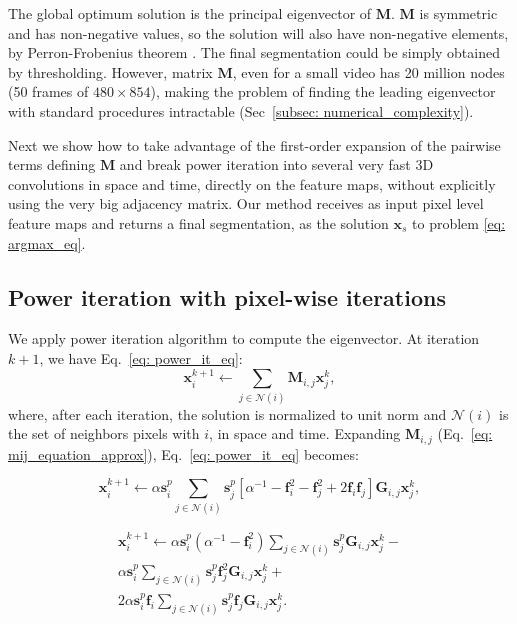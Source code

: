\documentclass{article}
\begin{document}
The global optimum solution is the principal eigenvector of $\mathbf{M}$. $\mathbf{M}$ is symmetric and has non-negative values, so the solution will also have non-negative elements, by Perron-Frobenius theorem \cite{frobenius}. The final segmentation could be simply obtained by thresholding. However, matrix $\mathbf{M}$, even for a small video has 20 million nodes (50 frames of $480 \times 854$), making the problem of finding the leading eigenvector with standard procedures intractable (Sec~\ref{subsec: numerical_complexity}).

Next we show how to take advantage of the first-order expansion of the pairwise terms defining $\mathbf{M}$ and break power iteration into several very fast 3D convolutions in space and time, directly on the feature maps, without explicitly using the very big adjacency matrix. Our method receives as input pixel level feature maps and returns a final segmentation, as the solution $\mathbf{x}_s$ to problem \ref{eq: argmax_eq}.


\subsection{Power iteration with pixel-wise iterations}
We apply power iteration algorithm to compute the eigenvector. At iteration $k+1$, we have Eq.~\ref{eq: power_it_eq}:
\begin{equation}
	\mathbf{x}^{k+1}_i \leftarrow \sum_{j \in \mathcal{N}(i)}\mathbf{M}_{i, j} \mathbf{x}^k_j, 
	\label{eq: power_it_eq}
\end{equation}
where, after each iteration, the solution is normalized to unit norm and $\mathcal{N}(i)$ is the set of neighbors pixels with $i$, in space and time. Expanding $\mathbf{M}_{i, j}$ (Eq.~\ref{eq: mij_equation_approx}), Eq.~\ref{eq: power_it_eq} becomes:

\begin{equation}
\mathbf{x}^{k+1}_i \leftarrow \alpha \mathbf{s}_i^p \sum_{j \in \mathcal{N}(i)} \mathbf{s}_j^p [\alpha^{-1} - \mathbf{f}_i^2 - \mathbf{f}_j^2 + 2 \mathbf{f}_i \mathbf{f}_j] \mathbf{G}_{i, j} \mathbf{x}^k_j,
\end{equation}

\begin{equation}
\label{eq: before_matrix_form}
  \begin{aligned}
    \mathbf{x}^{k+1}_i \leftarrow  \alpha \mathbf{s}_i^p ( \alpha^{-1} - \mathbf{f}_i^2) \sum_{j \in \mathcal{N}(i)} \mathbf{s}_j^p  \mathbf{G}_{i, j} \mathbf{x}^k_j -\\
    \alpha \mathbf{s}_i^p \sum_{j \in \mathcal{N}(i)}  \mathbf{s}_j^p \mathbf{f}_j^2 \mathbf{G}_{i, j} \mathbf{x}^k_j + \\
    2 \alpha \mathbf{s}_i^p \mathbf{f}_i  \sum_{j \in \mathcal{N}(i)} \mathbf{s}_j^p \mathbf{f}_j \mathbf{G}_{i, j} \mathbf{x}^k_j.
  \end{aligned}
\end{equation}
\end{document}
